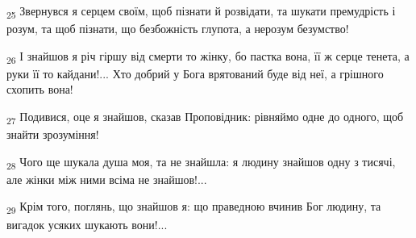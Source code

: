 \begin{tcolorbox}
\textsubscript{25} Звернувся я серцем своїм, щоб пізнати й розвідати, та шукати премудрість і розум, та щоб пізнати, що безбожність глупота, а нерозум безумство!
\end{tcolorbox}
\begin{tcolorbox}
\textsubscript{26} І знайшов я річ гіршу від смерти то жінку, бо пастка вона, її ж серце тенета, а руки її то кайдани!... Хто добрий у Бога врятований буде від неї, а грішного схопить вона!
\end{tcolorbox}
\begin{tcolorbox}
\textsubscript{27} Подивися, оце я знайшов, сказав Проповідник: рівняймо одне до одного, щоб знайти зрозуміння!
\end{tcolorbox}
\begin{tcolorbox}
\textsubscript{28} Чого ще шукала душа моя, та не знайшла: я людину знайшов одну з тисячі, але жінки між ними всіма не знайшов!...
\end{tcolorbox}
\begin{tcolorbox}
\textsubscript{29} Крім того, поглянь, що знайшов я: що праведною вчинив Бог людину, та вигадок усяких шукають вони!...
\end{tcolorbox}
